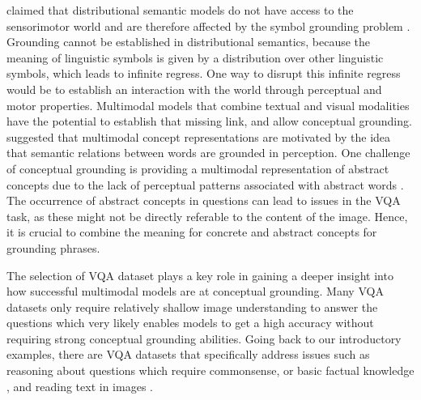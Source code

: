 \documentclass{article}
\begin{document}
\citet{baroni2016grounding} claimed that distributional semantic models do not have access to the sensorimotor world and are therefore affected by the symbol grounding problem \citep{harnad1990symbol}. Grounding cannot be established in distributional semantics, because the meaning of linguistic symbols is given by a distribution over other linguistic symbols, which leads to infinite regress. One way to disrupt this infinite regress would be to establish an interaction with the world through perceptual and motor properties.
Multimodal models that combine textual and visual modalities have the potential to establish that missing link, and allow conceptual grounding. \citet{beinborn2018multimodal} suggested that multimodal concept representations are motivated by the idea that semantic relations between words are grounded in perception. One challenge of conceptual grounding is providing a multimodal representation of abstract concepts due to the lack of perceptual patterns associated with abstract words \citep{hill2014multi}. The occurrence of abstract concepts in questions can lead to issues in the VQA task, as these might not be directly referable to the content of the image. Hence, it is crucial to combine the meaning for concrete and abstract concepts for grounding phrases.

The selection of VQA dataset plays a key role in gaining a deeper insight into how successful multimodal models are at conceptual grounding. Many VQA datasets only require relatively shallow image understanding to answer the questions which very likely enables models to get a high accuracy without requiring strong conceptual grounding abilities. Going back to our introductory examples, there are VQA datasets that specifically address issues such as reasoning about questions which require commonsense, or basic factual knowledge \citep{wang2018fvqa}, and reading text in images \citep{singh2019towards}.

\end{document}
